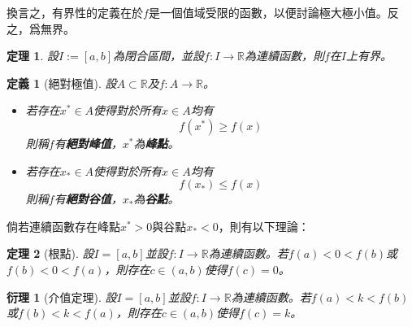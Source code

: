 \documentclass[12pt]{article}
\newtheorem{definition}{定義}
\newtheorem*{theorem}{定理}
\newtheorem*{corollary}{衍理}
\begin{document}
    換言之，有界性的定義在於$f$是一個值域受限的函數，以便討論極大極小值。反之，爲無界。

    \begin{theorem}
        設$I:=[a,b]$為閉合區間，並設$f:I\to\mathbb{R}$為連續函數，則$f$在$I$上有界。
    \end{theorem}

    \begin{definition}[絕對極值]
        設$A\subset \mathbb{R}$及$f:A\to\mathbb{R}$。\begin{itemize}
            \item 若存在$x^*\in A$使得對於所有$x\in A$均有$$f(x^*)\geq f(x)$$則稱$f$有\textbf{絕對峰值}，$x^*$為\textbf{峰點}。
            \item 若存在$x_*\in A$使得對於所有$x\in A$均有$$f(x_*)\leq f(x)$$則稱$f$有\textbf{絕對谷值}，$x_*$為\textbf{谷點}。
        \end{itemize}
    \end{definition}

    倘若連續函數存在峰點$x^*>0$與谷點$x_*<0$，則有以下理論：

    \begin{theorem}[根點]
        設$I=[a,b]$並設$f:I\to \mathbb{R}$為連續函數。若$f(a)<0<f(b)$或$f(b)<0<f(a)$，則存在$c\in(a,b)$使得$f(c)=0$。
    \end{theorem}

    \begin{corollary}[介值定理]
        設$I=[a,b]$並設$f:I\to \mathbb{R}$為連續函數。若$f(a)<k<f(b)$或$f(b)<k<f(a)$，則存在$c\in(a,b)$使得$f(c)=k$。
    \end{corollary}
\end{document}
